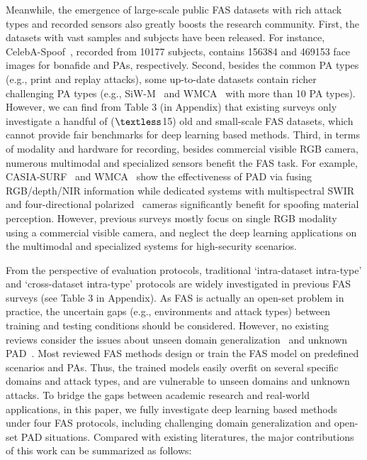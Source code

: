 \documentclass[10pt,journal,compsoc]{IEEEtran}
\begin{document}


Meanwhile, the emergence of large-scale public FAS datasets with rich attack types and recorded sensors also greatly boosts the research community. First, the datasets with vast samples and subjects have been released. For instance, CelebA-Spoof~\cite{zhang2020celeba}, recorded from 10177 subjects, contains 156384 and 469153 face images for bonafide and PAs, respectively. Second, besides the common PA types (e.g., print and replay attacks), some up-to-date datasets contain richer challenging PA types (e.g., SiW-M~\cite{liu2019deep} and WMCA~\cite{george2019biometric} with more than 10 PA types). However, we can find from Table 3 (in Appendix) that existing surveys only investigate a handful of ($\textless$15) old and small-scale FAS datasets, which cannot provide fair benchmarks for deep learning based methods. Third, in terms of modality and hardware for recording, besides commercial visible RGB camera, numerous multimodal and specialized sensors benefit the FAS task. For example, CASIA-SURF~\cite{zhang2020casia} and WMCA~\cite{george2019biometric} show the effectiveness of PAD via fusing RGB/depth/NIR information while dedicated systems with multispectral SWIR~\cite{steiner2016reliable} and four-directional polarized~\cite{tian2020face} cameras significantly benefit for spoofing material perception. However, previous surveys mostly focus on single RGB modality using a commercial visible camera, and neglect the deep learning applications on the multimodal and specialized systems for high-security scenarios.





From the perspective of evaluation protocols, traditional `intra-dataset intra-type' and `cross-dataset intra-type' protocols are widely investigated in previous FAS surveys (see Table 3 in Appendix). As FAS is actually an open-set problem in practice, the uncertain gaps (e.g., environments and attack types) between training and testing conditions should be considered. However, no existing reviews consider the issues about unseen domain generalization~\cite{shao2019multi,shao2019regularized,wang2020cross,jia2020single} and unknown PAD~\cite{arashloo2017anomaly,liu2019deep,qin2019learning,qin2020one}. Most reviewed FAS methods design or train the FAS model on predefined scenarios and PAs. Thus, the trained models easily overfit on several specific domains and attack types, and are vulnerable to unseen domains and unknown attacks. To bridge the gaps between academic research and real-world applications, in this paper, we fully investigate deep learning based methods under four FAS protocols, including challenging domain generalization and open-set PAD situations. 
Compared with existing literatures, the major contributions of this work can be summarized as follows: 
\end{document}
